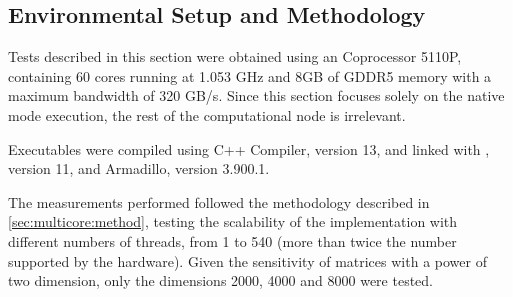 \documentclass[../thesis]{subfiles}
\begin{document}
	\subsection{Environmental Setup and Methodology}
	\label{subsec:mic:native:setup}

	Tests described in this section were obtained using an \intel\xeonphi Coprocessor 5110P, containing 60 cores running at 1.053 GHz and 8GB of GDDR5 memory with a maximum bandwidth of 320 GB/s. Since this section focuses solely on the native mode execution, the rest of the computational node is irrelevant.

	Executables were compiled using \intel C++ Compiler, version 13, and linked with \mkl, version 11, and Armadillo, version 3.900.1.

	The measurements performed followed the methodology described in \cref{sec:multicore:method}, testing the scalability of the implementation with different numbers of threads, from 1 to 540 (more than twice the number supported by the hardware). Given the sensitivity of matrices with a power of two dimension, only the dimensions 2000, 4000 and 8000 were tested.
\end{document}

